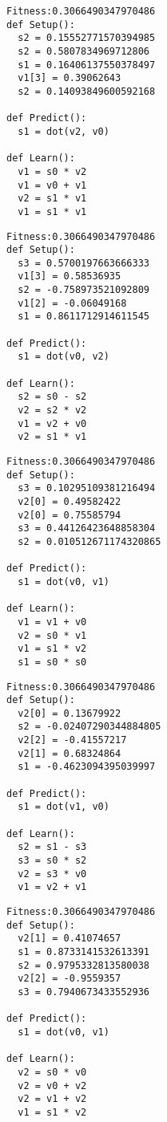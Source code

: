 \documentclass[twocolumn, a4j]{jarticle}
\begin{document}
\begin{lstlisting}[caption= No. 5.6]
Fitness:0.3066490347970486 
def Setup():
  s2 = 0.15552771570394985
  s2 = 0.5807834969712806
  s1 = 0.16406137550378497
  v1[3] = 0.39062643
  s2 = 0.14093849600592168

def Predict():
  s1 = dot(v2, v0)

def Learn():
  v1 = s0 * v2
  v1 = v0 + v1
  v2 = s1 * v1
  v1 = s1 * v1

\end{lstlisting}

\newpage

\begin{lstlisting}[caption= No. 5.7]
Fitness:0.3066490347970486 
def Setup():
  s3 = 0.5700197663666333
  v1[3] = 0.58536935
  s2 = -0.758973521092809
  v1[2] = -0.06049168
  s1 = 0.8611712914611545

def Predict():
  s1 = dot(v0, v2)

def Learn():
  s2 = s0 - s2
  v2 = s2 * v2
  v1 = v2 + v0
  v2 = s1 * v1

\end{lstlisting}

\begin{lstlisting}[caption= No. 5.8]
Fitness:0.3066490347970486 
def Setup():
  s3 = 0.10295109381216494
  v2[0] = 0.49582422
  v2[0] = 0.75585794
  s3 = 0.44126423648858304
  s2 = 0.010512671174320865

def Predict():
  s1 = dot(v0, v1)

def Learn():
  v1 = v1 + v0
  v2 = s0 * v1
  v1 = s1 * v2
  s1 = s0 * s0

\end{lstlisting}

\newpage

\begin{lstlisting}[caption= No. 5.9]
Fitness:0.3066490347970486 
def Setup():
  v2[0] = 0.13679922
  s2 = -0.02407290344884805
  v2[2] = -0.41557217
  v2[1] = 0.68324864
  s1 = -0.4623094395039997

def Predict():
  s1 = dot(v1, v0)

def Learn():
  s2 = s1 - s3
  s3 = s0 * s2
  v2 = s3 * v0
  v1 = v2 + v1

\end{lstlisting}

\begin{lstlisting}[caption= No. 5.10]
Fitness:0.3066490347970486 
def Setup():
  v2[1] = 0.41074657
  s1 = 0.8733141532613391
  s2 = 0.9795332813580038
  v2[2] = -0.9559357
  s3 = 0.7940673433552936

def Predict():
  s1 = dot(v0, v1)

def Learn():
  v2 = s0 * v0
  v2 = v0 + v2
  v2 = v1 + v2
  v1 = s1 * v2

\end{lstlisting}
\end{document}
